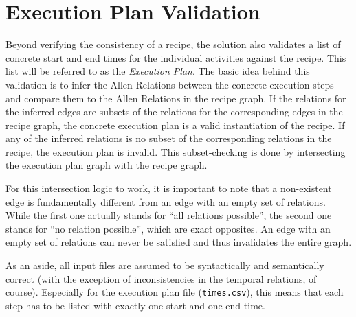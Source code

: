     \section{Execution Plan Validation}
    
    Beyond verifying the consistency of a recipe, the solution also validates a
    list of concrete start and end times for the individual activities against the
    recipe. This list will be referred to as the \emph{Execution Plan}.
    The basic idea behind this validation is to infer the Allen Relations between the
    concrete execution steps and compare them to the Allen Relations in the
    recipe graph. If the relations for the inferred edges are subsets of the
    relations for the corresponding edges in the recipe graph, the concrete
    execution plan is a valid instantiation of the recipe. If any of the
    inferred relations is no subset of the corresponding relations in the
    recipe, the execution plan is invalid. This subset-checking is done by
    intersecting the execution plan graph with the recipe graph.
    
    For this
    intersection logic to work, it is important to note that a non-existent edge
    is fundamentally different from an edge with an empty set of relations.
    While the first one actually stands for ``all relations possible'', the
    second one stands for ``no relation possible'', which are exact opposites.
    An edge with an empty set of
    relations can never be satisfied and thus invalidates the entire graph.

    As an aside, all input files are assumed to be syntactically and
    semantically correct (with the exception of inconsistencies in the temporal
    relations, of course). Especially for the execution plan file (\texttt{times.csv}),
    this means that each step has to be listed with exactly one start and one end time.